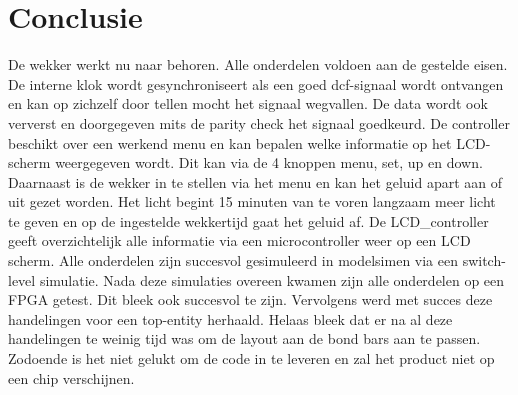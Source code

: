 \chapter{Conclusie}

De wekker werkt nu naar behoren. Alle onderdelen voldoen aan de gestelde eisen. De interne klok wordt gesynchroniseert als een goed dcf-signaal wordt ontvangen en kan op zichzelf door tellen mocht het signaal wegvallen. De data wordt ook ververst en doorgegeven mits de parity check het signaal goedkeurd. De controller beschikt over een werkend menu en kan bepalen welke informatie op het LCD-scherm weergegeven wordt. Dit kan via de 4 knoppen menu, set, up en down. Daarnaast is de wekker in te stellen via het menu en kan het geluid apart aan of uit gezet worden. Het licht begint 15 minuten van te voren langzaam meer licht te geven en op de ingestelde wekkertijd gaat het geluid af.  De LCD_controller geeft overzichtelijk alle informatie via een microcontroller weer op een LCD scherm.
Alle onderdelen zijn succesvol gesimuleerd in modelsim\textregistered en via een switch-level simulatie. Nada deze simulaties overeen kwamen zijn alle onderdelen op een FPGA getest. Dit bleek ook succesvol te zijn. Vervolgens werd met succes deze handelingen voor een top-entity herhaald.
Helaas bleek dat er na al deze handelingen te weinig tijd was om de layout aan de bond bars aan te passen. Zodoende is het niet gelukt om de code in te leveren en zal het product niet op een chip verschijnen.



% 
